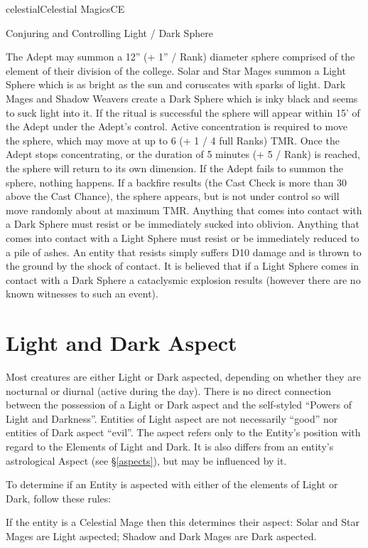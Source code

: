 \begin{College}[1.3]{celestial}{Celestial Magics}{CE}
\begin{ritual}[R-1]{Conjuring and Controlling Light / Dark Sphere}
\begin{effects}
The Adept may summon a 12” (+ 1” / Rank) diameter sphere comprised of
the element of their division of the college. Solar and Star Mages
summon a Light Sphere which is as bright as the sun and coruscates
with sparks of light.  Dark Mages and Shadow Weavers create a Dark
Sphere which is inky black and seems to suck light into it.  If the
ritual is successful the sphere will appear within 15’ of the Adept
under the Adept’s control.  Active concentration is required to move
the sphere, which may move at up to 6 (+ 1 / 4 full Ranks) TMR. Once
the Adept stops concentrating, or the duration of 5 minutes (+ 5 /
Rank) is reached, the sphere will return to its own dimension.  If the
Adept fails to summon the sphere, nothing happens.  If a backfire
results (the Cast Check is more than 30 above the Cast Chance), the
sphere appears, but is not under control so will move randomly about
at maximum TMR.  Anything that comes into contact with a Dark Sphere
must resist or be immediately sucked into oblivion.  Anything that
comes into contact with a Light Sphere must resist or be immediately
reduced to a pile of ashes.  An entity that resists simply suffers D10
damage and is thrown to the ground by the shock of contact.  It is
believed that if a Light Sphere comes in contact with a Dark Sphere a
cataclysmic explosion results (however there are no known witnesses to
such an event).
\end{effects}
\end{ritual}


\section{Light and Dark Aspect}
\label{celestial:aspect}
Most creatures are either Light or Dark aspected, depending on whether
they are nocturnal or diurnal (active during the day). There is no
direct connection between the possession of a Light or Dark aspect and
the self-styled “Powers of Light and Darkness”.  Entities of Light
aspect are not necessarily “good” nor entities of Dark aspect “evil”.
The aspect refers only to the Entity’s position with regard to the
Elements of Light and Dark. It is also differs from an entity’s
astrological Aspect (see \S\ref{aspects}), but may be influenced by
it.

To determine if an Entity is aspected with either of the elements of
Light or Dark, follow these rules:
\begin{Itemize}
\item If the entity is a Celestial Mage then this determines their
  aspect: Solar and Star Mages are Light aspected; Shadow and Dark
  Mages are Dark aspected.


\end{Itemize}
\end{College}

